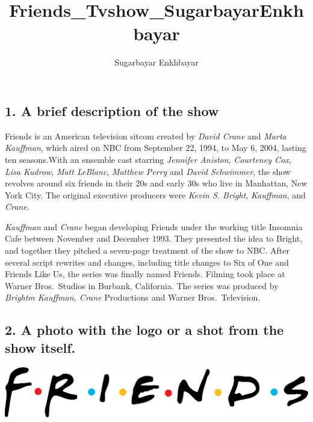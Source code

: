 \documentclass[
  letterpaper,
  DIV=11,
  numbers=noendperiod]{scrartcl}
\title{Friends\_Tvshow\_SugarbayarEnkhbayar}
\author{Sugarbayar Enkhbayar}
\date{}
\begin{document}
\maketitle
\ifdefined\Shaded\renewenvironment{Shaded}{\begin{tcolorbox}[boxrule=0pt, interior hidden, frame hidden, borderline west={3pt}{0pt}{shadecolor}, enhanced, breakable, sharp corners]}{\end{tcolorbox}}\fi

\hypertarget{a-brief-description-of-the-show}{%
\subsection{1. A brief description of the
show}\label{a-brief-description-of-the-show}}

Friends is an American television sitcom created by \emph{David Crane}
and \emph{Marta Kauffman}, which aired on NBC from September 22, 1994,
to May 6, 2004, lasting ten seasons.With an ensemble cast starring
\emph{Jennifer Aniston}, \emph{Courteney Cox}, \emph{Lisa Kudrow},
\emph{Matt LeBlanc}, \emph{Matthew Perry} and \emph{David Schwimmer},
the show revolves around six friends in their 20s and early 30s who live
in Manhattan, New York City. The original executive producers were
\emph{Kevin S. Bright}, \emph{Kauffman}, and \emph{Crane}.

\emph{Kauffman} and \emph{Crane} began developing Friends under the
working title Insomnia Cafe between November and December 1993. They
presented the idea to Bright, and together they pitched a seven-page
treatment of the show to NBC. After several script rewrites and changes,
including title changes to Six of One and Friends Like Us, the series
was finally named Friends. Filming took place at Warner Bros.~Studios in
Burbank, California. The series was produced by \emph{Brightm Kauffman,
Crane} Productions and Warner Bros.~Television.

\hypertarget{a-photo-with-the-logo-or-a-shot-from-the-show-itself.}{%
\subsection{2. A photo with the logo or a shot from the show
itself.}\label{a-photo-with-the-logo-or-a-shot-from-the-show-itself.}}

\includegraphics{friends_logo.png}
\end{document}
